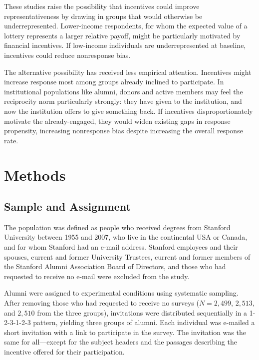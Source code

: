 These studies raise the possibility that incentives could improve representativeness by
drawing in groups that would otherwise be underrepresented. Lower-income respondents, for
whom the expected value of a lottery represents a larger relative payoff, might be
particularly motivated by financial incentives. If low-income individuals are
underrepresented at baseline, incentives could reduce nonresponse bias.

The alternative possibility has received less empirical attention. Incentives might
increase response most among groups already inclined to participate. In institutional
populations like alumni, donors and active members may feel the reciprocity norm
particularly strongly: they have given to the institution, and now the institution offers
to give something back. If incentives disproportionately motivate the already-engaged,
they would widen existing gaps in response propensity, increasing nonresponse bias
despite increasing the overall response rate.


\section{Methods}

\subsection{Sample and Assignment}

The population was defined as people who received degrees from Stanford University
between 1955 and 2007, who live in the continental USA or Canada, and for whom Stanford
had an e-mail address. Stanford employees and their spouses, current and former
University Trustees, current and former members of the Stanford Alumni Association Board
of Directors, and those who had requested to receive no e-mail were excluded from the
study.

Alumni were assigned to experimental conditions using systematic sampling. After removing
those who had requested to receive no surveys ($N = 2{,}499$, $2{,}513$, and $2{,}510$
from the three groups), invitations were distributed sequentially in a 1-2-3-1-2-3
pattern, yielding three groups of alumni. Each individual was e-mailed a short invitation
with a link to participate in the survey. The invitation was the same for all---except
for the subject headers and the passages describing the incentive offered for their
participation.

